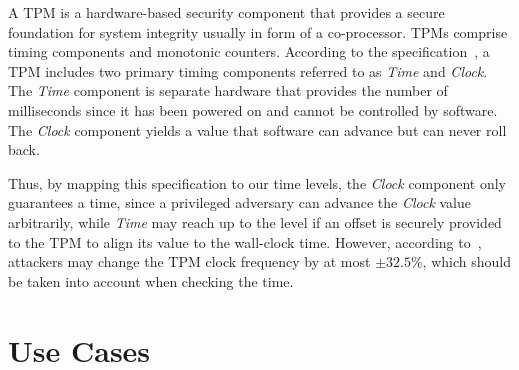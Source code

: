 \documentclass[sigplan,10pt]{acmart}
\begin{document}
A \ac{TPM} is a hardware-based security component that provides a secure foundation
for system integrity usually in form of a co-processor.
\acp{TPM} comprise timing components and monotonic counters. According to the
specification~\cite{TPM2.0-Rev-01.59}, a \ac{TPM} includes two primary timing
components referred to as \emph{Time} and \emph{Clock}. The \emph{Time}
component is separate hardware that provides the number of milliseconds since it
has been powered on and cannot be controlled by software. The \emph{Clock}
component yields a value that software can advance but can never roll back. 
%
%

Thus, by mapping this specification to our time levels, the \emph{Clock}
component only guarantees a \Tone{} time, since a privileged adversary can
advance the \emph{Clock} value arbitrarily, while \emph{Time} may reach up to
the \Tfour{} level if an offset is securely provided to the \ac{TPM} to align
its value to the wall-clock time. However, according to~\cite{TPM2.0-Rev-01.59},
attackers may change the \ac{TPM} clock frequency by at most $\pm{}32.5\%$,
which should be taken into account when checking the time.


\section{Use Cases}
\end{document}
